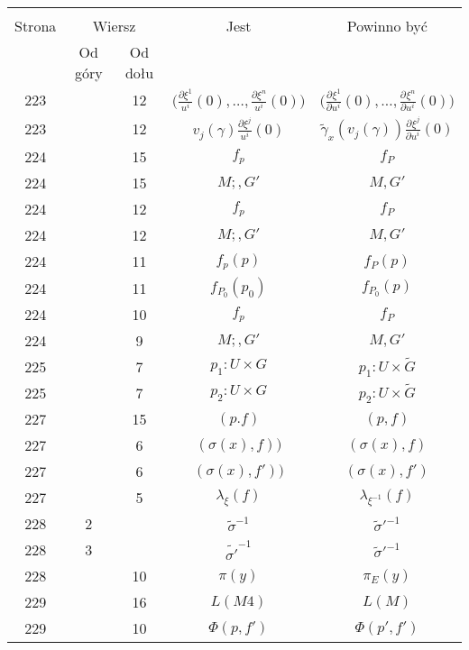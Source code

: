 \documentclass[a4paper,11pt]{article}
\newcommand{\fr}{\frac}
\newcommand{\pr}{\partial}
\newcommand{\ld}{\ldots}
\newcommand{\ti}{\times}
\newcommand{\ga}{\gamma}
\newcommand{\la}{\lambda}
\newcommand{\s}{\sigma}
\newcommand{\wt}{\widetilde}
\newcommand{\pd}[3]{\frac{ \pr^{ #1 } { #2 } }{ \pr { #3 }^{ #1 } }}
\begin{document}
\begin{center}
  \begin{tabular}{|c|c|c|c|c|}
    \hline
    & \multicolumn{2}{c|}{} & & \\
    Strona & \multicolumn{2}{c|}{Wiersz} & Jest
                              & Powinno być \\ \cline{2-3}
    & Od góry & Od dołu &  &  \\
    \hline
    223 & & 12 & $\big( \fr{ \pr \xi^{ 1 } }{ u^{ i } }( 0 ), \ld,
                 \fr{ \pr \xi^{ n } }{ u^{ i } }( 0 ) \big)$
           & $\big( \pd{}{ { \xi^{ 1 } } }{ { u^{ i } } }( 0 ), \ld,
             \pd{}{ { \xi^{ n } } }{ { u^{ i } } }( 0 ) \big)$ \\
    223 & & 12 & $v_{ j }( \ga ) \fr{ \pr \xi ^{ j } }{ u^{ i } }( 0 )$
           & $\wt{ \ga }_{ x }( v_{ j }( \ga ) )
             \pd{}{ { \xi ^{ j } } }{ { u^{ i } } }( 0 )$ \\
    224 & & 15 & $f_{ p }$ & $f_{ P }$ \\
    224 & & 15 & $M;, G'$ & $M, G'$ \\
    224 & & 12 & $f_{ p }$ & $f_{ P }$ \\
    224 & & 12 & $M;, G'$ & $M, G'$ \\
    224 & & 11 & $f_{ p }( p )$ & $f_{ P }( p )$ \\
    224 & & 11 & $f_{ P_{ 0 } }( p_{ 0 } )$ & $f_{ P_{ 0 } }( p )$ \\
    224 & & 10 & $f_{ p }$ & $f_{ P }$ \\
    224 & &  9 & $M;, G'$ & $M, G'$ \\
    225 & &  7 & $p_{ 1 } : U \ti G$ & $p_{ 1 } : U \ti \wt{ G }$ \\
    225 & &  7 & $p_{ 2 } : U \ti G$ & $p_{ 2 } : U \ti \wt{ G }$ \\
    227 & & 15 & $( p. f )$ & $( p, f )$ \\
    227 & &  6 & $( \s( x ), f ) )$ & $( \s( x ), f )$ \\
    227 & &  6 & $( \s( x ), f' ) )$ & $( \s( x ), f' )$ \\
    227 & &  5 & $\la_{ \xi }( f )$ & $\la_{ \xi^{ -1 } }( f )$ \\
    228 &  2 & & $\wt{ \s }^{ -1 }$ & $\wt{ \s }'^{ -1 }$ \\
    228 &  3 & & $\wt{ \s' }^{ -1 }$ & $\wt{ \s }'^{ -1 }$ \\
    228 & & 10 & $\pi( y )$ & $\pi_{ E }( y )$ \\
    229 & & 16 & $L( M 4 )$ & $L( M )$ \\
    229 & & 10 & $\Phi( p, f' )$ & $\Phi( p', f' )$ \\

\end{tabular}
\end{center}
\end{document}
